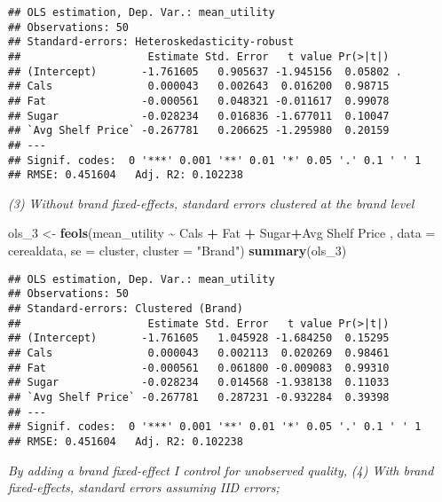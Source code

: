 \documentclass[
]{article}
\newenvironment{Shaded}{\begin{snugshade}}{\end{snugshade}}
\newcommand{\AttributeTok}[1]{\textcolor[rgb]{0.13,0.29,0.53}{#1}}
\newcommand{\FunctionTok}[1]{\textcolor[rgb]{0.13,0.29,0.53}{\textbf{#1}}}
\newcommand{\NormalTok}[1]{#1}
\newcommand{\OtherTok}[1]{\textcolor[rgb]{0.56,0.35,0.01}{#1}}
\newcommand{\SpecialCharTok}[1]{\textcolor[rgb]{0.81,0.36,0.00}{\textbf{#1}}}
\newcommand{\StringTok}[1]{\textcolor[rgb]{0.31,0.60,0.02}{#1}}
\begin{document}
\begin{verbatim}
## OLS estimation, Dep. Var.: mean_utility
## Observations: 50
## Standard-errors: Heteroskedasticity-robust 
##                    Estimate Std. Error   t value Pr(>|t|)    
## (Intercept)       -1.761605   0.905637 -1.945156  0.05802 .  
## Cals               0.000043   0.002643  0.016200  0.98715    
## Fat               -0.000561   0.048321 -0.011617  0.99078    
## Sugar             -0.028234   0.016836 -1.677011  0.10047    
## `Avg Shelf Price` -0.267781   0.206625 -1.295980  0.20159    
## ---
## Signif. codes:  0 '***' 0.001 '**' 0.01 '*' 0.05 '.' 0.1 ' ' 1
## RMSE: 0.451604   Adj. R2: 0.102238
\end{verbatim}

\emph{(3) Without brand fixed-effects, standard errors clustered at the
brand level}

\begin{Shaded}
\begin{Highlighting}[]
\NormalTok{ols\_3 }\OtherTok{\textless{}{-}} \FunctionTok{feols}\NormalTok{(mean\_utility }\SpecialCharTok{\textasciitilde{}}\NormalTok{ Cals }\SpecialCharTok{+}\NormalTok{ Fat }\SpecialCharTok{+}\NormalTok{ Sugar}\SpecialCharTok{+}\StringTok{\textasciigrave{}}\AttributeTok{Avg Shelf Price}\StringTok{\textasciigrave{}}\NormalTok{ , }\AttributeTok{data =}\NormalTok{ cerealdata, }\AttributeTok{se =} \StringTok{\textquotesingle{}cluster\textquotesingle{}}\NormalTok{, }\AttributeTok{cluster =} \StringTok{"Brand"}\NormalTok{)}
\FunctionTok{summary}\NormalTok{(ols\_3)}
\end{Highlighting}
\end{Shaded}

\begin{verbatim}
## OLS estimation, Dep. Var.: mean_utility
## Observations: 50
## Standard-errors: Clustered (Brand) 
##                    Estimate Std. Error   t value Pr(>|t|) 
## (Intercept)       -1.761605   1.045928 -1.684250  0.15295 
## Cals               0.000043   0.002113  0.020269  0.98461 
## Fat               -0.000561   0.061800 -0.009083  0.99310 
## Sugar             -0.028234   0.014568 -1.938138  0.11033 
## `Avg Shelf Price` -0.267781   0.287231 -0.932284  0.39398 
## ---
## Signif. codes:  0 '***' 0.001 '**' 0.01 '*' 0.05 '.' 0.1 ' ' 1
## RMSE: 0.451604   Adj. R2: 0.102238
\end{verbatim}

\emph{By adding a brand fixed-effect I control for unobserved quality,}
\emph{(4) With brand fixed-effects, standard errors assuming IID
errors;}
\end{document}
